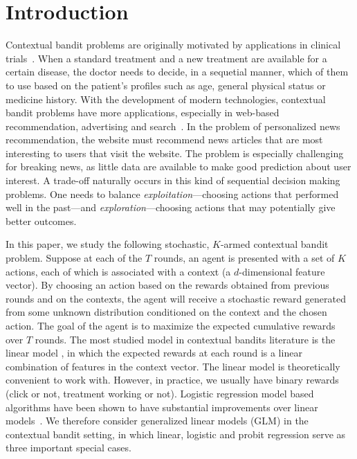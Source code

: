 \section{Introduction}
Contextual bandit problems are originally motivated by applications in clinical trials~\cite{woodroofe1979one}. When a standard treatment and a new treatment are available for a certain disease, the doctor needs to decide, in a sequetial manner, which of them to use based on the patient's profiles such as age, general physical status or medicine history. With the development of modern technologies, contextual bandit problems have more applications, especially in web-based recommendation, advertising and search~\cite{agarwal2009online, li2010contextual, liunbiased}. In the problem of personalized news recommendation, the website must recommend news articles that are most interesting to users that visit the website.  The problem is especially challenging for breaking news, as little data are available to make good prediction about user interest.
A trade-off naturally occurs in this kind of sequential decision making problems.  One needs to balance \emph{exploitation}---choosing actions that performed well in the past---and \emph{exploration}---choosing actions that may potentially give better outcomes.

In this paper, we study the following stochastic, $K$-armed contextual bandit problem. Suppose at each of the $T$ rounds, an agent is presented with a set of $K$ actions, each of which is associated with a context (a $d$-dimensional feature vector). By choosing an action based on the rewards obtained from previous rounds and on the contexts, the agent will receive a stochastic reward generated from some unknown distribution conditioned on the context and the chosen action. The goal of the agent is to maximize the expected cumulative rewards over $T$ rounds. The most studied model in contextual bandits literature is the linear model \cite{auer2003using,dani2008stochastic,rusmevichientong2010linearly,chu2011contextual,abbasi2011improved}, in which the expected rewards at each round is a linear combination of features in the context vector. The linear model is theoretically convenient to work with. However, in practice, we usually have binary rewards (click or not, treatment working or not).  Logistic regression model based algorithms have been shown to have substantial improvements over linear models~\cite{liunbiased}.  We therefore consider generalized linear models (GLM) in the contextual bandit setting, in which linear, logistic and probit regression serve as three important special cases. 

